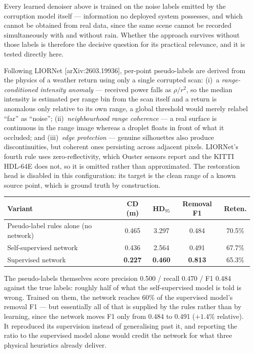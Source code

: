 \documentclass[12pt,a4paper]{article}
\begin{document}
Every learned denoiser above is trained on the noise labels emitted by the
corruption model itself --- information no deployed system possesses, and
which cannot be obtained from real data, since the same scene cannot be
recorded simultaneously with and without rain. Whether the approach survives
without those labels is therefore the decisive question for its practical
relevance, and it is tested directly here.

Following LIORNet [arXiv:2603.19936], per-point pseudo-labels are derived
from the physics of a weather return using only a single corrupted scan:
(i)~a \emph{range-conditioned intensity anomaly} --- received power falls as
$\rho/r^2$, so the median intensity is estimated per range bin from the scan
itself and a return is anomalous only relative to its own range, a global
threshold would merely relabel ``far'' as ``noise''; (ii)~\emph{neighbourhood
range coherence} --- a real surface is continuous in the range image whereas
a droplet floats in front of what it occluded; and (iii)~\emph{edge
protection} --- genuine silhouettes also produce discontinuities, but
coherent ones persisting across adjacent pixels. LIORNet's fourth rule uses
zero-reflectivity, which Ouster sensors report and the KITTI HDL-64E does
not, so it is omitted rather than approximated. The restoration head is
disabled in this configuration: its target is the clean range of a known
source point, which is ground truth by construction.

\begin{table}[h]
\centering\small
\begin{tabular}{lcccc}
\toprule
\textbf{Variant} & \textbf{CD (m)} & \textbf{HD$_{95}$} & \textbf{Removal F1} & \textbf{Reten.}\\
\midrule
Pseudo-label rules alone (no network) & 0.465 & 3.297 & 0.484 & 70.5\%\\
Self-supervised network & 0.436 & 2.564 & 0.491 & 67.7\%\\
Supervised network & \textbf{0.227} & \textbf{0.460} & \textbf{0.813} & 65.3\%\\
\bottomrule
\end{tabular}
\end{table}

The pseudo-labels themselves score precision 0.500 / recall 0.470 / F1 0.484
against the true labels: roughly half of what the self-supervised model is
told is wrong. Trained on them, the network reaches 60\% of the supervised
model's removal F1 --- but essentially all of that is supplied by the rules
rather than by learning, since the network moves F1 only from 0.484 to 0.491
($+1.4\%$ relative). It reproduced its supervision instead of generalising
past it, and reporting the ratio to the supervised model alone would credit
the network for what three physical heuristics already deliver.
\end{document}
